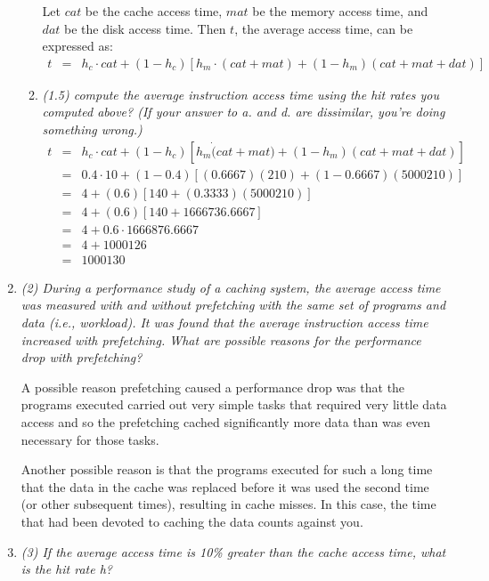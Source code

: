\documentclass[letterpaper,11pt]{article}
\begin{document}
\begin{enumerate}
\begin{enumerate}
    Let $cat$ be the cache access time, $mat$ be the memory access time, and $dat$ be the disk access time.  Then $t$, the average access time, can be expressed as:
    \begin{eqnarray*}
    t &=& h_c\cdot cat + (1 - h_c)[h_m\cdot(cat + mat) + (1 - h_m)(cat + mat + dat)]
    \end{eqnarray*}
    \item \emph{(1.5) compute the average instruction access time using the hit rates you computed above? (If your answer to a. and d. are dissimilar, you’re doing something wrong.)}
    \begin{eqnarray*}
    t &=& h_c\cdot cat + (1 - h_c)[h_m\dot(cat + mat) + (1 - h_m)(cat + mat + dat)] \\
    &=& 0.4\cdot 10 + (1 - 0.4)[(0.6667)(210) + (1 - 0.6667)(5000210)] \\
    &=& 4 + (0.6)[140 + (0.3333)(5000210)] \\
    &=& 4 + (0.6)[140 + 1666736.6667] \\
    &=& 4 + 0.6\cdot1666876.6667 \\
    &=& 4 + 1000126 \\
    &=& 1000130
    \end{eqnarray*}
  \end{enumerate}
  \item \emph{(2) During a performance study of a caching system, the average access time was measured with and without prefetching with the same set of programs and data (i.e., workload). It was found that the average instruction access time increased with prefetching. What are possible reasons for the performance drop with prefetching?}

  A possible reason prefetching caused a performance drop was that the programs executed carried out very simple tasks that required very little data access and so the prefetching cached significantly more data than was even necessary for those tasks.
  
  Another possible reason is that the programs executed for such a long time that the data in the cache was replaced before it was used the second time (or other subsequent times), resulting in cache misses.  In this case, the time that had been devoted to caching the data counts against you.
  \item \emph{(3) If the average access time is 10\% greater than the cache access time, what is the hit rate h?}


\end{enumerate}
\end{document}

